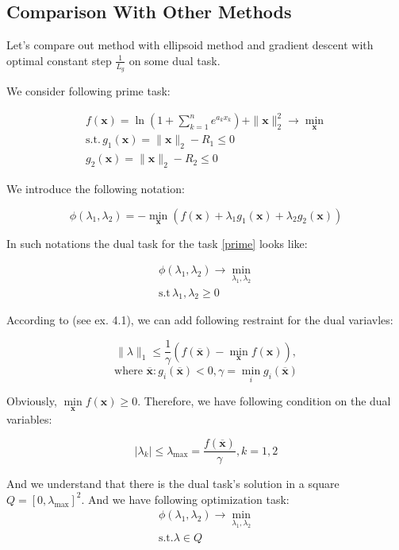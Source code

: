 \documentclass[12pt]{article}
\begin{document}
\subsection{Comparison With Other Methods}

Let's compare out method with ellipsoid method and gradient descent with optimal constant step $\frac{1}{L_g}$ on some dual task.

We consider following prime task:

\begin{gather}
\label{prime}
f(\textbf{x}) = \ln \left(1+\sum_{k=1}^ne^{a_kx_k}\right) + \|\textbf{x}\|_2^2\rightarrow \min\limits_{\textbf{x}}\\
\text{s.t.}\,g_1(\textbf{x}) = \|\textbf{x}\|_2-R_1\leq0\\
g_2(\textbf{x}) = \|\textbf{x}\|_2-R_2\leq0
\end{gather}

We introduce the following notation:

\begin{equation}
\label{phi}
\phi(\lambda_1, \lambda_2) = -\min\limits_{\textbf{x}}\left(f(\textbf{x}) +\lambda_1 g_1(\textbf{x}) +\lambda_2g_2(\textbf{x})\right)
\end{equation}

In such notations the dual task for the task \ref{prime} looks like:

\begin{gather}
\phi(\lambda_1, \lambda_2) \rightarrow \min\limits_{\lambda_1, \lambda_2}\\
\text{s.t}\, \lambda_1, \lambda_2 \geq 0
\end{gather}

According to \cite{task} (see ex. 4.1), we can add following restraint for the dual variavles:

$$\|{\lambda}\|_1 \leq \frac{1}{\gamma}\left(f(\overline{\textbf{x}}) -\min\limits_{\textbf{x}}f(\textbf{x})\right),$$
$$ \text{where $\overline{\textbf{x}}:g_i(\overline{\textbf{x}})<0,\gamma = \min\limits_ig_i(\overline{\textbf{x}})$}$$

Obviously, $\min\limits_{\textbf{x}}f(\textbf{x}) \geq 0$. Therefore, we have following condition on the dual variables:

$$|\lambda_k| \leq \lambda_{\text{max}}=\frac{f(\overline{\textbf{x}})}{\gamma}, k=1,2$$

And we understand that there is the dual task's solution in a square $Q = [0, \lambda_{\text{max}}]^2$. And we have following optimization task:
\begin{gather}
\label{dual}
\phi(\lambda_1, \lambda_2) \rightarrow \min\limits_{\lambda_1, \lambda_2} \\
\text{s.t.} \lambda\in Q
\end{gather}
\end{document}

